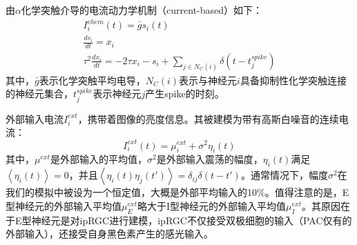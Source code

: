 \documentclass[lang=cn,11pt,a4paper,cite=numbers]{elegantpaper}
\begin{document}
  由$\alpha$化学突触介导的电流动力学机制（current-based）如下：
\begin{gather}
    I_{i}^{chem}(t) = \bar{g}s_{i}(t) \\
    \frac{ds_{i}}{dt} = x_{i} \\
    \tau^{2}\frac{dx_{i}}{dt} = -2{\tau}x_{i} - s_{i} + \sum_{j \in N_{C}(i)}\delta(t - t_{j}^{spike})
\end{gather}
其中，$\bar{g}$表示化学突触平均电导，$N_{C}(i)$表示与神经元$i$具备抑制性化学突触连接的神经元集合，$t_{j}^{spike}$表示神经元$j$产生spike的时刻。

  外部输入电流$I_{i}^{ext}$，携带着图像的亮度信息。其被建模为带有高斯白噪音的连续电流：
\begin{equation}
    I_{i}^{ext}(t) = \mu_{i}^{ext} + \sigma^{2}\eta_{i}(t)
\end{equation}
其中，$\mu^{ext}$是外部输入的平均值，$\sigma^{2}$是外部输入震荡的幅度，$\eta_{i}(t)$满足$\left\langle\eta_{i}(t)\right\rangle = 0$，并且$\left\langle\eta_{i}(t)\eta_{j}(t')\right\rangle = \delta_{ij}\delta(t - t')$。通常情况下，幅度$\sigma^{2}$在我们的模拟中被设为一个恒定值，大概是外部平均输入的10\%。值得注意的是，E型神经元的外部输入平均值$\mu_{E}^{ext}$略大于I型神经元的外部输入平均值$\mu_{I}^{ext}$。其原因在于E型神经元是对ipRGC进行建模，ipRGC不仅接受双极细胞的输入（PAC仅有的外部输入），还接受自身黑色素产生的感光输入。


\end{document}
